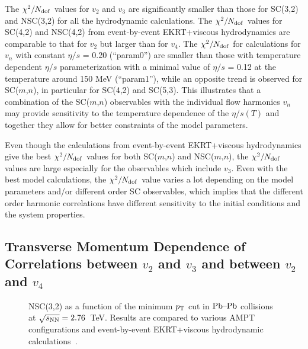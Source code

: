 The $\chi^2/N_{\rm dof}$ values for $v_2$ and $v_3$ are significantly smaller than those for SC(3,2) and NSC(3,2) for all the hydrodynamic calculations. The $\chi^2/N_{\rm dof}$ values for SC(4,2) and NSC(4,2) from event-by-event EKRT+viscous hydrodynamics are comparable to that for $v_2$ but larger than for $v_4$. The $\chi^2/N_{\rm dof}$ for calculations for $v_n$ with constant $\eta/s$ = 0.20 (``param0'') are smaller than those with temperature dependent $\eta/s$ parameterization with a minimal value of $\eta/s$ = 0.12 at the temperature around 150 MeV (``param1''), while an opposite trend is observed for SC($m$,$n$), in particular for SC(4,2) and SC(5,3). 
This illustrates that a combination of the SC($m$,$n$) observables with the individual flow harmonics $v_n$ may provide sensitivity to the temperature dependence of the $\eta/s(T)$ and together they allow for better constraints of the model parameters.

Even though the calculations from event-by-event EKRT+viscous hydrodynamics give the best $\chi^2/N_{\rm dof}$ values for both SC($m$,$n$) and NSC($m$,$n$), the $\chi^2/N_{\rm dof}$
values are large especially for the observables which include $v_3$. 
Even with the best model calculations, the $\chi^2/N_{\rm dof}$ value varies a lot depending on the model parameters and/or different order SC observables, which implies that the different order harmonic correlations have different sensitivity to the initial conditions and the system properties.

\subsection{Transverse Momentum Dependence of Correlations between $v_2$ and $v_3$ and between $v_2$ and $v_4$}
\label{sec:ptdepsc}
\begin{figure}[t!]
             \begin{center}
              \end{center}
             \caption{NSC(3,2) as a function of the minimum $p_{\rm T}$ cut in $\textnormal{Pb--Pb}$ collisions at $\sqrt{s_{\textnormal{NN}}}=2.76$~TeV. Results are compared to various AMPT configurations and event-by-event EKRT+viscous hydrodynamic calculations~\cite{Niemi:2015qia}.}
             \label{fig:Figure_8}
\end{figure}

